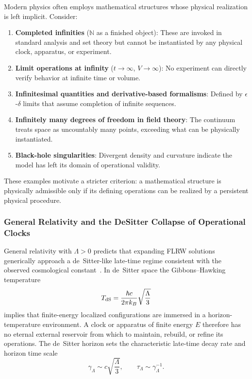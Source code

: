 \documentclass[11pt,a4paper]{article}
\begin{document}
Modern physics often employs mathematical structures whose physical realization is left implicit. Consider:

\begin{enumerate}
  \item \textbf{Completed infinities} ($\mathbb{N}$ as a finished object): These are invoked in standard analysis and set theory but cannot be instantiated by any physical clock, apparatus, or experiment.
  \item \textbf{Limit operations at infinity} ($t \to \infty$, $V \to \infty$): No experiment can directly verify behavior at infinite time or volume.
  \item \textbf{Infinitesimal quantities and derivative-based formalisms}: Defined by $\epsilon$-$\delta$ limits that assume completion of infinite sequences.
  \item \textbf{Infinitely many degrees of freedom in field theory}: The continuum treats space as uncountably many points, exceeding what can be physically instantiated.
  \item \textbf{Black-hole singularities}: Divergent density and curvature indicate the model has left its domain of operational validity.
\end{enumerate}

These examples motivate a stricter criterion: a mathematical structure is physically admissible only if its defining operations can be realized by a persistent physical procedure.
\subsubsection{General Relativity and the DeSitter Collapse of Operational Clocks}

General relativity with $\Lambda > 0$ predicts that expanding FLRW solutions generically approach a de~Sitter-like late-time regime consistent with the observed cosmological constant~\cite{Planck2018VI}. In de~Sitter space the Gibbons--Hawking temperature~\cite{GibbonsHawking1977}
\[
T_{\rm dS} = \frac{\hbar c}{2\pi k_B} \sqrt{\frac{\Lambda}{3}}
\]
implies that finite-energy localized configurations are immersed in a horizon-temperature environment. A clock or apparatus of finite energy $E$ therefore has no eternal external reservoir from which to maintain, rebuild, or refine its operations. The de~Sitter horizon sets the characteristic late-time decay rate and horizon time scale
\[
\gamma_\Lambda \sim c\sqrt{\frac{\Lambda}{3}},
\qquad
\tau_\Lambda \sim \gamma_\Lambda^{-1}.
\]
\end{document}
